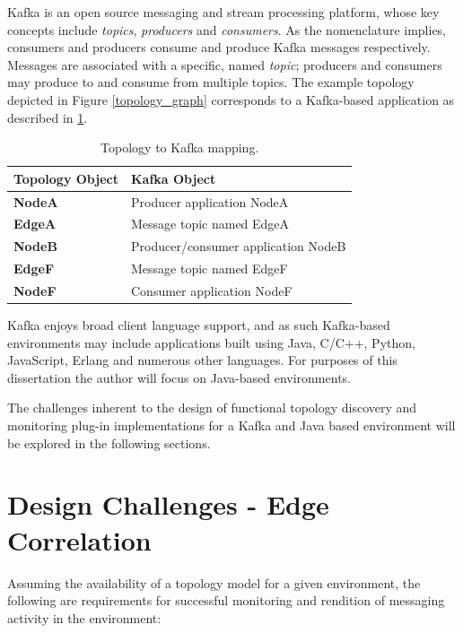 Kafka is an open source messaging and stream processing platform, whose key concepts include  \textit{topics}, \textit{producers} and \textit{consumers}. As the nomenclature implies, consumers and producers consume and produce Kafka messages respectively. Messages are associated with a specific, named \textit{topic}; producers and consumers may produce to and consume from multiple topics. The example topology depicted in Figure \ref{topology_graph} corresponds to a Kafka-based application as described in \ref{topology_to_kafka_mapping}.

\vspace{10 mm}

\begin{table}[H]
	\centering
	\begin{tabular}{ |p{4cm}||p{8cm}| }
		\hline
		Topology Object & Kafka Object \\
		\hline
		\textbf{NodeA}   & Producer application NodeA   \\
		\textbf{EdgeA}   & Message topic named EdgeA   \\
		\textbf{NodeB}   & Producer/consumer application NodeB   \\
		\textbf{EdgeF}   & Message topic named EdgeF   \\
		\textbf{NodeF}   & Consumer application NodeF   \\	    
		\hline
	\end{tabular}
	\caption{Topology to Kafka mapping.}
	\label{topology_to_kafka_mapping}
\end{table}

Kafka enjoys broad client language support, and as such Kafka-based environments may include applications built using Java, C/C++, Python, JavaScript, Erlang and numerous other languages. For purposes of this dissertation the author will focus on Java-based environments.

The challenges inherent to the design of functional topology discovery and monitoring plug-in implementations for a Kafka and Java based environment will be explored in the following sections.

\section{Design Challenges - Edge Correlation}

Assuming the availability of a topology model for a given environment, the following are requirements for successful monitoring and rendition of messaging activity in the environment:

